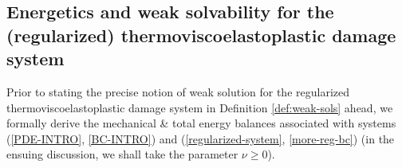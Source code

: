 \documentclass[a4paper,10pt,reqno]{amsart}
\numberwithin{equation}{section}
\numberwithin{equation}{section}
\begin{document}
\subsection{Energetics and weak solvability for the  (regularized) thermoviscoelastoplastic damage system}
\label{ss:2.2}
 Prior to stating the precise notion of weak solution %
 for the regularized thermoviscoelastoplastic damage system in
 Definition \ref{def:weak-sols} ahead,
 we 
 formally derive the mechanical \& total energy balances associated with 
  systems (\ref{PDE-INTRO}, \ref{BC-INTRO}) and 
  (\ref{regularized-system}, \ref{more-reg-bc}) (in the ensuing discussion, we shall take the parameter $\nu\geq 0$). 
\end{document}
